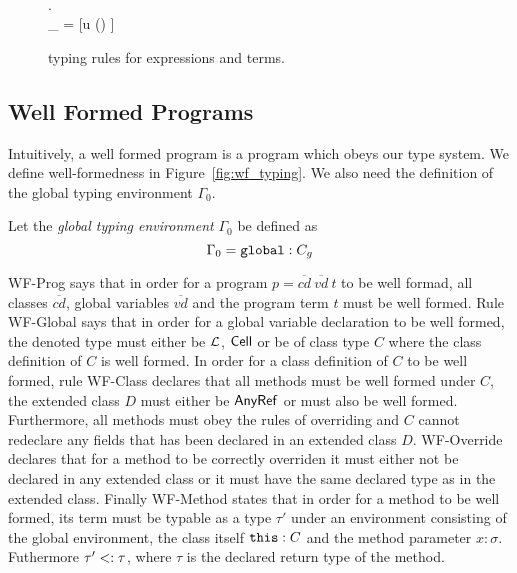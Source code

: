 \begin{figure}[h!]
    \vspace{0.5em}

    { \andalso {} \\
    \forall {} \in {}. \; \\
    \Gamma_{} = [u \mapsto \CellType \mid () \in {}]\\
    }
    {  }

  \caption{\RACL{} typing rules for expressions and terms.}
  \label{fig:expr_typing}
\end{figure}

\subsection{Well Formed Programs}%
\label{sub:well_formed_programs}

Intuitively, a well formed program is a program which obeys our type system. We
define well-formedness in Figure~\ref{fig:wf_typing}. We also need the
definition of the global typing environment $\Gamma_0$. 
\begin{definition}
  Let the \emph{global typing environment} $\Gamma_0$ be defined as 
  \begin{equation*}
    \Gamma_0 = \mbox{\mdseries\texttt{global}} : C_g
  \end{equation*}
\end{definition}
{\sc WF-Prog} says that in order for a program $p =
\overline{cd}~\overline{vd}~t$ to be well formad, all classes $\overline{cd}$,
global variables $\overline{vd}$ and the program term $t$ must be well formed.
Rule {\sc WF-Global} says that in order for a global variable declaration to be
well formed, the denoted type must either be $\mbox{$\mathcal{L}$}$, $\mbox{$\mathsf{Cell}$}$ or be of
class type $C$ where the class definition of $C$ is well formed. In order for a
class definition of $C$ to be well formed, rule {\sc WF-Class} declares that all
methods must be well formed under $C$, the extended class $D$ must either be
$\mbox{$\mathsf{AnyRef}$}$ or must also be well formed. Furthermore, all methods must obey the
rules of overriding and $C$ cannot redeclare any fields that has been declared
in an extended class $D$. {\sc WF-Override} declares that for a method to be
correctly overriden it must either not be declared in any extended class or it
must have the same declared type as in the extended class. Finally {\sc
WF-Method} states that in order for a method to be well formed, its term must be
typable as a type $\tau'$ under an environment consisting of the global
environment, the class itself $\mbox{\mdseries\texttt{this}} : C$ and the method parameter $x: \sigma$.
Futhermore $\tau' <: \tau$, where $\tau$ is the declared return type of the
method.



